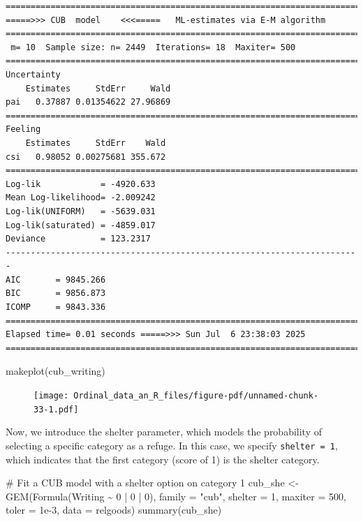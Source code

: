 \documentclass[
  letterpaper,
  DIV=11,
  numbers=noendperiod]{scrartcl}
\newenvironment{Shaded}{\begin{snugshade}}{\end{snugshade}}
\newcommand{\AttributeTok}[1]{\textcolor[rgb]{0.40,0.45,0.13}{#1}}
\newcommand{\CommentTok}[1]{\textcolor[rgb]{0.37,0.37,0.37}{#1}}
\newcommand{\DecValTok}[1]{\textcolor[rgb]{0.68,0.00,0.00}{#1}}
\newcommand{\FloatTok}[1]{\textcolor[rgb]{0.68,0.00,0.00}{#1}}
\newcommand{\FunctionTok}[1]{\textcolor[rgb]{0.28,0.35,0.67}{#1}}
\newcommand{\NormalTok}[1]{\textcolor[rgb]{0.00,0.23,0.31}{#1}}
\newcommand{\OtherTok}[1]{\textcolor[rgb]{0.00,0.23,0.31}{#1}}
\newcommand{\SpecialCharTok}[1]{\textcolor[rgb]{0.37,0.37,0.37}{#1}}
\newcommand{\StringTok}[1]{\textcolor[rgb]{0.13,0.47,0.30}{#1}}
\begin{document}
\begin{verbatim}
======================================================================= 
=====>>> CUB  model    <<<=====   ML-estimates via E-M algorithm   
======================================================================= 
 m= 10  Sample size: n= 2449  Iterations= 18  Maxiter= 500 
======================================================================= 
Uncertainty                                            
    Estimates     StdErr     Wald
pai   0.37887 0.01354622 27.96869
======================================================================= 
Feeling                                            
    Estimates     StdErr    Wald
csi   0.98052 0.00275681 355.672
======================================================================= 
Log-lik            = -4920.633 
Mean Log-likelihood= -2.009242 
Log-lik(UNIFORM)   = -5639.031 
Log-lik(saturated) = -4859.017 
Deviance           = 123.2317 
----------------------------------------------------------------------- 
AIC       = 9845.266 
BIC       = 9856.873 
ICOMP     = 9843.336 
======================================================================= 
Elapsed time= 0.01 seconds =====>>> Sun Jul  6 23:38:03 2025 
======================================================================= 
\end{verbatim}

\begin{Shaded}
\begin{Highlighting}[]
\FunctionTok{makeplot}\NormalTok{(cub\_writing)}
\end{Highlighting}
\end{Shaded}

\begin{figure}[H]

{\centering \texttt{[image: Ordinal\_data\_an\_R\_files/figure-pdf/unnamed-chunk-33-1.pdf]}

}

\end{figure}

Now, we introduce the shelter parameter, which models the probability of
selecting a specific category as a refuge. In this case, we specify
\texttt{shelter\ =\ 1}, which indicates that the first category (score
of 1) is the shelter category.

\begin{Shaded}
\begin{Highlighting}[]
\CommentTok{\# Fit a CUB model with a shelter option on category 1}
\NormalTok{cub\_she }\OtherTok{\textless{}{-}} \FunctionTok{GEM}\NormalTok{(}\FunctionTok{Formula}\NormalTok{(Writing }\SpecialCharTok{\textasciitilde{}} \DecValTok{0} \SpecialCharTok{|} \DecValTok{0} \SpecialCharTok{|} \DecValTok{0}\NormalTok{), }\AttributeTok{family =} \StringTok{"cub"}\NormalTok{, }\AttributeTok{shelter =} \DecValTok{1}\NormalTok{,}
               \AttributeTok{maxiter =} \DecValTok{500}\NormalTok{, }\AttributeTok{toler =} \FloatTok{1e{-}3}\NormalTok{, }\AttributeTok{data =}\NormalTok{ relgoods)}
\FunctionTok{summary}\NormalTok{(cub\_she)}
\end{Highlighting}
\end{Shaded}
\end{document}
